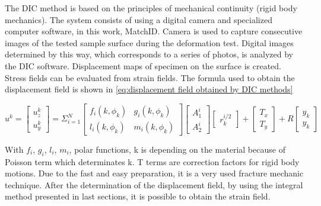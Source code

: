 The DIC method is based on the principles of mechanical continuity (rigid body mechanics). The system consists of using a digital camera and specialized computer software, in this work, MatchID. Camera is used to capture consecutive images of the tested sample surface during the deformation test. Digital images determined by this way, which corresponds to a series of photos, is analyzed by the DIC software. Displacement maps of specimen on the surface is created. Stress fields can be evaluated from strain fields. The formula used to obtain the displacement field is shown in \ref{eq:displacement field obtained by DIC methods}

\begin{equation}
	u^{k}=
	\begin{bmatrix}
		u_{z}^{k}\\u_{y}^{k}
	\end{bmatrix}
	=\Sigma^{N}_{i=1}
	\begin{bmatrix}
		f_{i}(k,\phi_{k}) & g_{i}(k,\phi_{k})\\ l_{i}(k,\phi_{k}) & m_{i}(k,\phi_{k})
	\end{bmatrix}
	\begin{bmatrix}
		A^{i}_{1}\\A^{i}_{2}
	\end{bmatrix}
	\begin{bmatrix}
		r^{i/2}_{k}
	\end{bmatrix}
	+
	\begin{bmatrix}
		T_{x}\\T_{y}
	\end{bmatrix}
	+
	R
	\begin{bmatrix}
		y_{k}\\y_{k}
	\end{bmatrix}
	\label{eq:displacement field obtained by DIC methods}
\end{equation} 

With $f_{i}$, $g_{i}$, $l_{i}$, $m_{i}$, polar functions, k is depending on the material because of Poisson term which determinates k. T terms are correction factors for rigid body motions.
Due to the fast and easy preparation, it is a very used fracture mechanic technique. After the determination of the displacement field, by using the integral method presented in last sections, it is possible to obtain the strain field.

